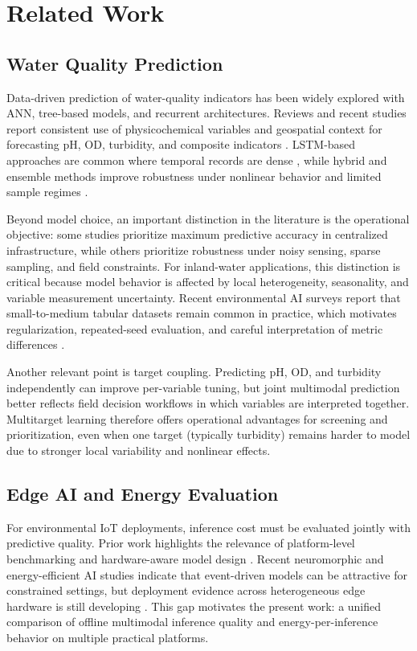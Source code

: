 \section{Related Work}

\subsection{Water Quality Prediction}
Data-driven prediction of water-quality indicators has been widely explored with ANN, tree-based models, and recurrent architectures. Reviews and recent studies report consistent use of physicochemical variables and geospatial context for forecasting pH, OD, turbidity, and composite indicators \cite{yan2024,ahmed2019,aladhaileh2021,pan2025}. LSTM-based approaches are common where temporal records are dense \cite{liu2019,pyo2023,qi2020}, while hybrid and ensemble methods improve robustness under nonlinear behavior and limited sample regimes \cite{wu2022,chadalavada2025,kalaivanan2022,palani2008}.

Beyond model choice, an important distinction in the literature is the operational objective: some studies prioritize maximum predictive accuracy in centralized infrastructure, while others prioritize robustness under noisy sensing, sparse sampling, and field constraints. For inland-water applications, this distinction is critical because model behavior is affected by local heterogeneity, seasonality, and variable measurement uncertainty. Recent environmental AI surveys report that small-to-medium tabular datasets remain common in practice, which motivates regularization, repeated-seed evaluation, and careful interpretation of metric differences \cite{yan2024,lowe2022,rahu2023,miller2025}.

Another relevant point is target coupling. Predicting pH, OD, and turbidity independently can improve per-variable tuning, but joint multimodal prediction better reflects field decision workflows in which variables are interpreted together. Multitarget learning therefore offers operational advantages for screening and prioritization, even when one target (typically turbidity) remains harder to model due to stronger local variability and nonlinear effects.

\subsection{Edge AI and Energy Evaluation}
For environmental IoT deployments, inference cost must be evaluated jointly with predictive quality. Prior work highlights the relevance of platform-level benchmarking and hardware-aware model design \cite{rosero2020,zulkifli2022,lamrini2024,elshafeiy2023}. Recent neuromorphic and energy-efficient AI studies indicate that event-driven models can be attractive for constrained settings, but deployment evidence across heterogeneous edge hardware is still developing \cite{aral2024,azadi2025,huijbregts2024,aribe2025future}. This gap motivates the present work: a unified comparison of offline multimodal inference quality and energy-per-inference behavior on multiple practical platforms.

